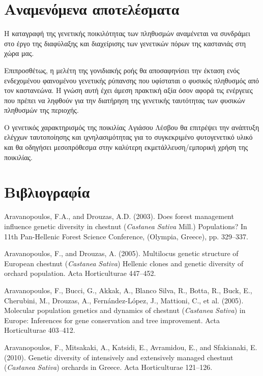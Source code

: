 \documentclass[12pt,a4paper,]{report}
\begin{document}
\hypertarget{-}{%
\section{Αναμενόμενα αποτελέσματα}\label{-}}

H καταγραφή της γενετικής ποικιλότητας των πληθυσμών αναμένεται να
συνδράμει στο έργο της διαφύλαξης και διαχείρισης των γενετικών πόρων
της καστανιάς στη χώρα μας.

Επιπροσθέτως, η μελέτη της γονιδιακής ροής θα αποσαφηνίσει την έκταση
ενός ενδεχομένου φαινομένου γενετικής ρύπανσης που υφίσταται ο φυσικός
πληθυσμός από τον καστανεώνα. Η γνώση αυτή έχει άμεση πρακτική αξία όσον
αφορά τις ενέργειες που πρέπει να ληφθούν για την διατήρηση της
γενετικής ταυτότητας των φυσικών πληθυσμών της περιοχής.

Ο γενετικός χαρακτηρισμός της ποικιλίας Αγιάσου Λέσβου θα επιτρέψει την
ανάπτυξη ελέγχων ταυτοποίησης και ιχνηλασιμότητας για το συγκεκριμένο
φυτογενετικό υλικό και θα οδηγήσει μεσοπρόθεσμα στην καλύτερη
εκμετάλλευση/εμπορική χρήση της ποικιλίας.

\section{Βιβλιογραφία}

\hypertarget{refs}{}
\leavevmode\hypertarget{ref-aravanopoulos_does_2003}{}%
Aravanopoulos, F.A., and Drouzas, A.D. (2003). Does forest management
influence genetic diversity in chestnut (\emph{Castanea} \emph{Sativa}
Mill.) Populations? In 11th Pan-Hellenic Forest Science Conference,
(Olympia, Greece), pp. 329--337.

\leavevmode\hypertarget{ref-aravanopoulos_multilocus_2005}{}%
Aravanopoulos, F., and Drouzas, A. (2005). Multilocus genetic structure
of European chestnut (\emph{Castanea} \emph{Sativa}) Hellenic clones and
genetic diversity of orchard population. Acta Horticulturae 447--452.

\leavevmode\hypertarget{ref-aravanopoulos_molecular_2005}{}%
Aravanopoulos, F., Bucci, G., Akkak, A., Blanco Silva, R., Botta, R.,
Buck, E., Cherubini, M., Drouzas, A., Fernández-López, J., Mattioni, C.,
et al. (2005). Molecular population genetics and dynamics of chestnut
(\emph{Castanea} \emph{Sativa}) in Europe: Inferences for gene
conservation and tree improvement. Acta Horticulturae 403--412.

\leavevmode\hypertarget{ref-aravanopoulos_genetic_2010}{}%
Aravanopoulos, F., Mitsakaki, A., Katsidi, E., Avramidou, E., and
Sfakianaki, E. (2010). Genetic diversity of intensively and extensively
managed chestnut (\emph{Castanea} \emph{Sativa}) orchards in Greece.
Acta Horticulturae 121--126.
\end{document}

